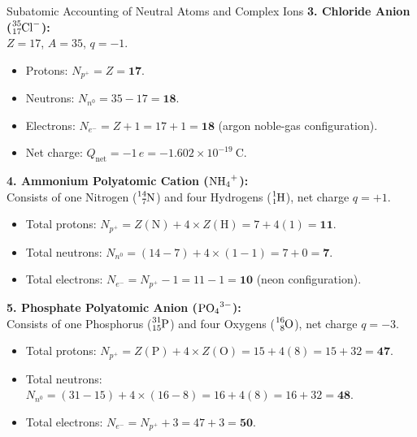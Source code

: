 \begin{workedexample}{Subatomic Accounting of Neutral Atoms and Complex Ions}
\textbf{3. Chloride Anion ($\ce{^{35}_{17}Cl^-}$):}\\
$Z = 17$, $A = 35$, $q = -1$.
\begin{itemize}[leftmargin=1.5em,itemsep=1pt]
  \item Protons: $N_{p^+} = Z = \mathbf{17}$.
  \item Neutrons: $N_{n^0} = 35 - 17 = \mathbf{18}$.
  \item Electrons: $N_{e^-} = Z + 1 = 17 + 1 = \mathbf{18}$ (argon noble-gas configuration).
  \item Net charge: $Q_{\text{net}} = -1\,e = -1.602 \times 10^{-19}\ \mathrm{C}$.
\end{itemize}

\textbf{4. Ammonium Polyatomic Cation ($\ce{NH_4^+}$):}\\
Consists of one Nitrogen ($\ce{^{14}_7N}$) and four Hydrogens ($\ce{^1_1H}$), net charge $q = +1$.
\begin{itemize}[leftmargin=1.5em,itemsep=1pt]
  \item Total protons: $N_{p^+} = Z(\mathrm{N}) + 4 \times Z(\mathrm{H}) = 7 + 4(1) = \mathbf{11}$.
  \item Total neutrons: $N_{n^0} = (14 - 7) + 4 \times (1 - 1) = 7 + 0 = \mathbf{7}$.
  \item Total electrons: $N_{e^-} = N_{p^+} - 1 = 11 - 1 = \mathbf{10}$ (neon configuration).
\end{itemize}

\textbf{5. Phosphate Polyatomic Anion ($\ce{PO_4^{3-}}$):}\\
Consists of one Phosphorus ($\ce{^{31}_{15}P}$) and four Oxygens ($\ce{^{16}_8O}$), net charge $q = -3$.
\begin{itemize}[leftmargin=1.5em,itemsep=1pt]
  \item Total protons: $N_{p^+} = Z(\mathrm{P}) + 4 \times Z(\mathrm{O}) = 15 + 4(8) = 15 + 32 = \mathbf{47}$.
  \item Total neutrons: $N_{n^0} = (31 - 15) + 4 \times (16 - 8) = 16 + 4(8) = 16 + 32 = \mathbf{48}$.
  \item Total electrons: $N_{e^-} = N_{p^+} + 3 = 47 + 3 = \mathbf{50}$.
\end{itemize}
\end{workedexample}

